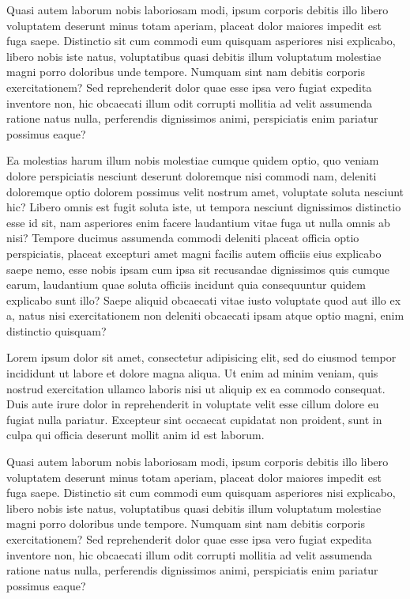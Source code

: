 \documentclass[
    12pt,               %
    openright,          %
    twoside,            %
    a4paper,            %
    chapter=TITLE,     %
    english,            %
    spanish,            %
    portuguese              %
    ]{abntex2}
\begin{document}
Quasi autem laborum nobis laboriosam modi, ipsum corporis debitis illo libero voluptatem deserunt minus totam aperiam, placeat dolor maiores impedit est fuga saepe. Distinctio sit cum commodi eum quisquam asperiores nisi explicabo, libero nobis iste natus, voluptatibus quasi debitis illum voluptatum molestiae magni porro doloribus unde tempore. Numquam sint nam debitis corporis exercitationem? Sed reprehenderit dolor quae esse ipsa vero fugiat expedita inventore non, hic obcaecati illum odit corrupti mollitia ad velit assumenda ratione natus nulla, perferendis dignissimos animi, perspiciatis enim pariatur possimus eaque?


Ea molestias harum illum nobis molestiae cumque quidem optio, quo veniam dolore perspiciatis nesciunt deserunt doloremque nisi commodi nam, deleniti doloremque optio dolorem possimus velit nostrum amet, voluptate soluta nesciunt hic? Libero omnis est fugit soluta iste, ut tempora nesciunt dignissimos distinctio esse id sit, nam asperiores enim facere laudantium vitae fuga ut nulla omnis ab nisi? Tempore ducimus assumenda commodi deleniti placeat officia optio perspiciatis, placeat excepturi amet magni facilis autem officiis eius explicabo saepe nemo, esse nobis ipsam cum ipsa sit recusandae dignissimos quis cumque earum, laudantium quae soluta officiis incidunt quia consequuntur quidem explicabo sunt illo? Saepe aliquid obcaecati vitae iusto voluptate quod aut illo ex a, natus nisi exercitationem non deleniti obcaecati ipsam atque optio magni, enim distinctio quisquam?

Lorem ipsum dolor sit amet, consectetur adipisicing elit, sed do eiusmod tempor incididunt ut labore et dolore magna aliqua. Ut enim ad minim veniam, quis nostrud exercitation ullamco laboris nisi ut aliquip ex ea commodo consequat. Duis aute irure dolor in reprehenderit in voluptate velit esse cillum dolore eu fugiat nulla pariatur. Excepteur sint occaecat cupidatat non proident, sunt in culpa qui officia deserunt mollit anim id est laborum.


Quasi autem laborum nobis laboriosam modi, ipsum corporis debitis illo libero voluptatem deserunt minus totam aperiam, placeat dolor maiores impedit est fuga saepe. Distinctio sit cum commodi eum quisquam asperiores nisi explicabo, libero nobis iste natus, voluptatibus quasi debitis illum voluptatum molestiae magni porro doloribus unde tempore. Numquam sint nam debitis corporis exercitationem? Sed reprehenderit dolor quae esse ipsa vero fugiat expedita inventore non, hic obcaecati illum odit corrupti mollitia ad velit assumenda ratione natus nulla, perferendis dignissimos animi, perspiciatis enim pariatur possimus eaque?
\end{document}
